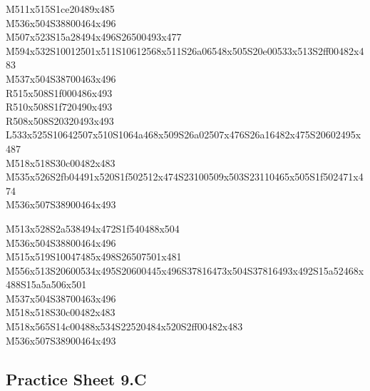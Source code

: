 \documentclass{article}
\begin{document}
\begin{multicols}{5}
\begin{center}
M511x515S1ce20489x485 %
\\M536x504S38800464x496 %
\\M507x523S15a28494x496S26500493x477 %
\\M594x532S10012501x511S10612568x511S26a06548x505S20e00533x513S2ff00482x483 %
\\M537x504S38700463x496 %
\\R515x508S1f000486x493 %
\\R510x508S1f720490x493 %
\\R508x508S20320493x493 %
\\L533x525S10642507x510S1064a468x509S26a02507x476S26a16482x475S20602495x487 %
\\M518x518S30c00482x483 %
\\M535x526S2fb04491x520S1f502512x474S23100509x503S23110465x505S1f502471x474 %
\\M536x507S38900464x493 %
\vfil
\columnbreak

M513x528S2a538494x472S1f540488x504 %
\\M536x504S38800464x496 %
\\M515x519S10047485x498S26507501x481 %
\\M556x513S20600534x495S20600445x496S37816473x504S37816493x492S15a52468x488S15a5a506x501 %
\\M537x504S38700463x496 %
\\M518x518S30c00482x483 %
\\M518x565S14c00488x534S22520484x520S2ff00482x483 %
\\M536x507S38900464x493 %
\vfil

\end{center}
\end{multicols}

\subsection{Practice Sheet 9.C}
\end{document}
